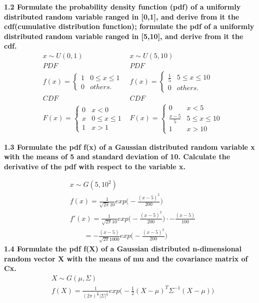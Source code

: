 \noindent\textbf{1.2 Formulate the probability density function (pdf) of a uniformly distributed random variable ranged in [0,1], and derive from it the cdf(cumulative distribution function); formulate the pdf of a uniformly distributed random variable ranged in [5,10], and derive from it the cdf.}
\begin{align}
&x\sim U(0,1)&x\sim U(5,10)\nonumber\\
&PDF&PDF\nonumber\\
&f(x)= \begin{cases}
1& 0 \leq x \leq 1\\
0& others.
\end{cases}
&f(x)= \begin{cases}
\frac{1}{5}& 5 \leq x \leq 10\\
0& others.
\end{cases}\nonumber\\
&CDF&CDF\nonumber\\
&F(x)= \begin{cases}
0& x <0\\
x& 0 \leq x \leq 1\\
1& x >1
\end{cases}
&F(x)= \begin{cases}
0& x <5\\
\frac{x-5}{5}& 5 \leq x \leq 10\\
1& x >10
\end{cases}\nonumber
\end{align}

\noindent \textbf{1.3 Formulate the pdf f(x) of a Gaussian distributed random variable x with the means of 5 and standard deviation of 10. Calculate the derivative of the pdf with respect to the variable x.}

\begin{align}
&x\sim G(5,10^2)\nonumber\\
&f(x)= \frac{1}{\sqrt{2\pi}10}exp\Big(-\frac{(x-5)^2}{200}\Big) \nonumber \\
&f'(x)=\frac{1}{\sqrt{2\pi}10}exp\Big(-\frac{(x-5)^2}{200}\Big)\cdot -\frac{(x-5)}{100}\nonumber\\
&~~~~~~~~~=-\frac{(x-5)}{\sqrt{2\pi}1000} exp\Big(-\frac{(x-5)^2}{200}\Big) \nonumber
\end{align}
\newpage
\noindent \textbf{1.4 Formulate the pdf f(X) of a Gaussian distributed n-dimensional random vector X with the means of mu and the covariance matrix of Cx.}
\begin{align}
&X\sim G(\mu,\Sigma)\nonumber\\
&f(X)=\frac{1}{(2\pi)^\frac{n}{2}|\Sigma|^\frac{1}{2}}exp\Big(-\frac{1}{2}(X-\mu)^T\Sigma^{-1}(X-\mu)\Big) \nonumber
\end{align}

